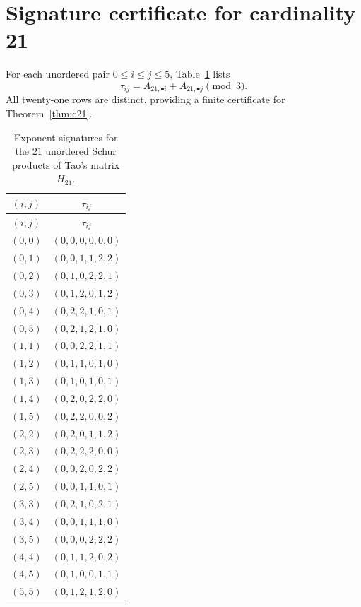 \documentclass[11pt,a4paper]{article}
\begin{document}
\section{Signature certificate for cardinality 21}\label{app:c21cert}

For each unordered pair $0\leq i\leq j\leq5$, Table~\ref{tab:sig21} lists
\[
 \tau_{ij}=A_{21,\bullet i}+A_{21,\bullet j}\pmod3.
\]
All twenty-one rows are distinct, providing a finite certificate for
Theorem~\ref{thm:c21}.

\begin{longtable}{c@{\qquad}c}
\caption{Exponent signatures for the $21$ unordered Schur products of
Tao's matrix $H_{21}$.}\label{tab:sig21}\\
\toprule
$(i,j)$ & $\tau_{ij}$\\
\midrule
\endfirsthead
\toprule
$(i,j)$ & $\tau_{ij}$\\
\midrule
\endhead
\bottomrule
\endfoot
$(0,0)$ & $(0,0,0,0,0,0)$\\
$(0,1)$ & $(0,0,1,1,2,2)$\\
$(0,2)$ & $(0,1,0,2,2,1)$\\
$(0,3)$ & $(0,1,2,0,1,2)$\\
$(0,4)$ & $(0,2,2,1,0,1)$\\
$(0,5)$ & $(0,2,1,2,1,0)$\\
$(1,1)$ & $(0,0,2,2,1,1)$\\
$(1,2)$ & $(0,1,1,0,1,0)$\\
$(1,3)$ & $(0,1,0,1,0,1)$\\
$(1,4)$ & $(0,2,0,2,2,0)$\\
$(1,5)$ & $(0,2,2,0,0,2)$\\
$(2,2)$ & $(0,2,0,1,1,2)$\\
$(2,3)$ & $(0,2,2,2,0,0)$\\
$(2,4)$ & $(0,0,2,0,2,2)$\\
$(2,5)$ & $(0,0,1,1,0,1)$\\
$(3,3)$ & $(0,2,1,0,2,1)$\\
$(3,4)$ & $(0,0,1,1,1,0)$\\
$(3,5)$ & $(0,0,0,2,2,2)$\\
$(4,4)$ & $(0,1,1,2,0,2)$\\
$(4,5)$ & $(0,1,0,0,1,1)$\\
$(5,5)$ & $(0,1,2,1,2,0)$\\
\end{longtable}
\end{document}
